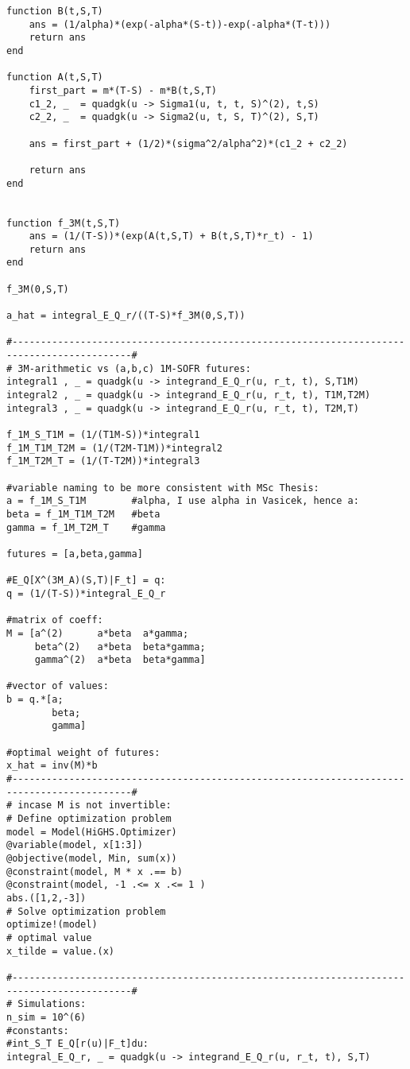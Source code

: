 \begin{verbatim}
function B(t,S,T)
    ans = (1/alpha)*(exp(-alpha*(S-t))-exp(-alpha*(T-t)))
    return ans
end

function A(t,S,T)
    first_part = m*(T-S) - m*B(t,S,T)
    c1_2, _  = quadgk(u -> Sigma1(u, t, t, S)^(2), t,S) 
    c2_2, _  = quadgk(u -> Sigma2(u, t, S, T)^(2), S,T)

    ans = first_part + (1/2)*(sigma^2/alpha^2)*(c1_2 + c2_2)

    return ans
end


function f_3M(t,S,T)
    ans = (1/(T-S))*(exp(A(t,S,T) + B(t,S,T)*r_t) - 1)
    return ans
end

f_3M(0,S,T)

a_hat = integral_E_Q_r/((T-S)*f_3M(0,S,T))

#-------------------------------------------------------------------------------------------#
# 3M-arithmetic vs (a,b,c) 1M-SOFR futures: 
integral1 , _ = quadgk(u -> integrand_E_Q_r(u, r_t, t), S,T1M)
integral2 , _ = quadgk(u -> integrand_E_Q_r(u, r_t, t), T1M,T2M)
integral3 , _ = quadgk(u -> integrand_E_Q_r(u, r_t, t), T2M,T)

f_1M_S_T1M = (1/(T1M-S))*integral1
f_1M_T1M_T2M = (1/(T2M-T1M))*integral2
f_1M_T2M_T = (1/(T-T2M))*integral3

#variable naming to be more consistent with MSc Thesis:
a = f_1M_S_T1M        #alpha, I use alpha in Vasicek, hence a: 
beta = f_1M_T1M_T2M   #beta
gamma = f_1M_T2M_T    #gamma

futures = [a,beta,gamma]

#E_Q[X^(3M_A)(S,T)|F_t] = q: 
q = (1/(T-S))*integral_E_Q_r 

#matrix of coeff: 
M = [a^(2)      a*beta  a*gamma;
     beta^(2)   a*beta  beta*gamma; 
     gamma^(2)  a*beta  beta*gamma] 
     
#vector of values: 
b = q.*[a;
        beta;
        gamma] 

#optimal weight of futures:
x_hat = inv(M)*b 
#-------------------------------------------------------------------------------------------#
# incase M is not invertible: 
# Define optimization problem
model = Model(HiGHS.Optimizer)
@variable(model, x[1:3])
@objective(model, Min, sum(x))
@constraint(model, M * x .== b)
@constraint(model, -1 .<= x .<= 1 )
abs.([1,2,-3])
# Solve optimization problem
optimize!(model)
# optimal value
x_tilde = value.(x)

#-------------------------------------------------------------------------------------------#
# Simulations: 
n_sim = 10^(6)
#constants: 
#int_S_T E_Q[r(u)|F_t]du:
integral_E_Q_r, _ = quadgk(u -> integrand_E_Q_r(u, r_t, t), S,T)


\end{verbatim}
